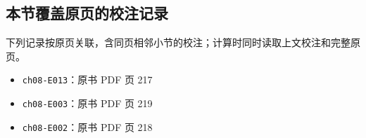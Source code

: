\documentclass[
  10pt,
  fontset=fandol]{ctexart}
\providecommand{\tightlist}{%
  \setlength{\itemsep}{0pt}\setlength{\parskip}{0pt}}
\begin{document}
\subsection{本节覆盖原页的校注记录}\label{ux672cux8282ux8986ux76d6ux539fux9875ux7684ux6821ux6ce8ux8bb0ux5f55}

下列记录按原页关联，含同页相邻小节的校注；计算时同时读取上文校注和完整原页。

\begin{itemize}
\tightlist
\item
  \texttt{ch08-E013}：原书 PDF 页 217
\item
  \texttt{ch08-E003}：原书 PDF 页 219
\item
  \texttt{ch08-E002}：原书 PDF 页 218
\end{itemize}
\end{document}
